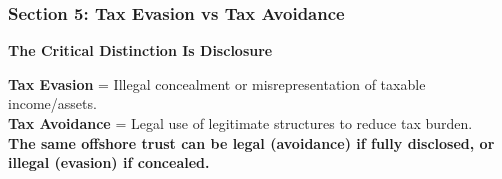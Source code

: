 \documentclass[12pt,aspectratio=169]{beamer}
\newcommand{\keypoint}[1]{\textcolor{deepblue}{\textbf{#1}}}
\begin{document}
	\begin{frame}
		\frametitle{\fontsize{13}{15}\selectfont \textbf{Section 5: Tax Evasion vs Tax Avoidance}}
		\vspace{0.3cm}
		\begin{center}
			{\fontsize{12}{14}\selectfont \textbf{The Critical Distinction Is Disclosure}}
		\end{center}
		\vspace{0.2cm}
		\begin{block}{}
			\centering
			\textbf{Tax Evasion} = Illegal concealment or misrepresentation of taxable income/assets. \\
			\vspace{0.1cm}
			\textbf{Tax Avoidance} = Legal use of legitimate structures to reduce tax burden. \\
			\vspace{0.1cm}
			\keypoint{The same offshore trust can be legal (avoidance) if fully disclosed, or illegal (evasion) if concealed.}
		\end{block}
	\end{frame}
	
\end{document}
